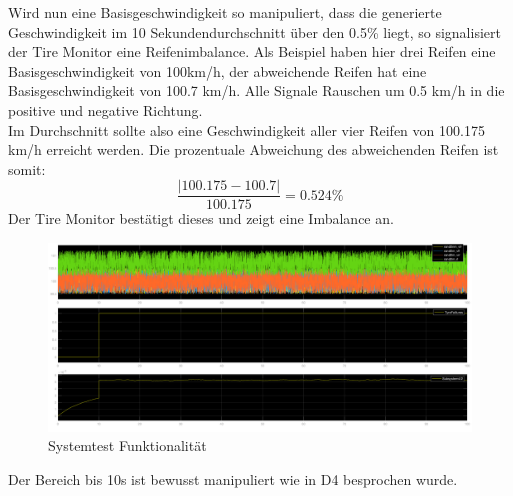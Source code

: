 Wird nun eine Basisgeschwindigkeit so manipuliert, dass die generierte Geschwindigkeit im 10 Sekundendurchschnitt über den 0.5\% liegt, so signalisiert der Tire Monitor eine Reifenimbalance. Als Beispiel haben hier drei Reifen eine Basisgeschwindigkeit von 100km/h, der abweichende Reifen hat eine Basisgeschwindigkeit von 100.7 km/h. Alle Signale Rauschen um 0.5 km/h in die positive und negative Richtung.\\
Im Durchschnitt sollte also eine Geschwindigkeit aller vier Reifen von 100.175 km/h erreicht werden. Die prozentuale Abweichung des abweichenden Reifen ist somit:
$$
\dfrac{|100.175-100.7|}{100.175} = 0.524\%
$$
Der Tire Monitor bestätigt dieses und zeigt eine Imbalance an.
\begin{figure}[H]
	\centering
	\includegraphics[width=0.95\linewidth]{../Graphiken/RandomAbweichung}
	\caption{Systemtest Funktionalität}
	\label{fig:funkt}
\end{figure}
Der Bereich bis 10s ist bewusst manipuliert wie in D4 besprochen wurde.
